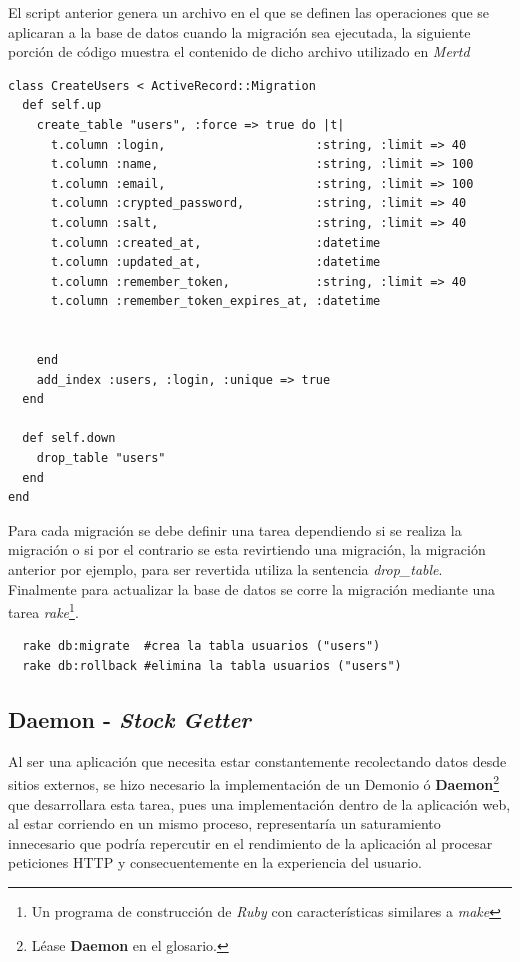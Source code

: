 El script anterior genera un archivo en el que se definen las operaciones que se aplicaran a la base de datos cuando la migración sea ejecutada, la siguiente porción de código muestra el contenido de dicho archivo utilizado en \emph{Mertd}

\begin{verbatim}
class CreateUsers < ActiveRecord::Migration
  def self.up
    create_table "users", :force => true do |t|
      t.column :login,                     :string, :limit => 40
      t.column :name,                      :string, :limit => 100
      t.column :email,                     :string, :limit => 100
      t.column :crypted_password,          :string, :limit => 40
      t.column :salt,                      :string, :limit => 40
      t.column :created_at,                :datetime
      t.column :updated_at,                :datetime
      t.column :remember_token,            :string, :limit => 40
      t.column :remember_token_expires_at, :datetime


    end
    add_index :users, :login, :unique => true
  end

  def self.down
    drop_table "users"
  end
end
\end{verbatim}

Para cada migración se debe definir una tarea dependiendo si se realiza la migración o si por el contrario se esta revirtiendo una migración, la migración anterior por ejemplo, para ser revertida utiliza la sentencia \emph{drop\_table}.\\

Finalmente para actualizar la base de datos se corre la migración mediante una tarea \emph{rake}\footnote{Un programa de construcción de \emph{Ruby} con características similares a \emph{make}}.

\begin{verbatim}
  rake db:migrate  #crea la tabla usuarios ("users")
  rake db:rollback #elimina la tabla usuarios ("users")
\end{verbatim}

\subsection{Daemon - \emph{Stock Getter}}

Al ser una aplicación que necesita estar constantemente recolectando datos desde sitios externos, se hizo necesario la implementación de un Demonio ó \textbf{Daemon}\footnote{Léase \textbf{Daemon} en el glosario.} que desarrollara esta tarea, pues una implementación dentro de la aplicación web, al estar corriendo en un mismo proceso, representaría un saturamiento innecesario que podría repercutir en el rendimiento de la aplicación al procesar peticiones HTTP y consecuentemente en la experiencia del usuario.\\

